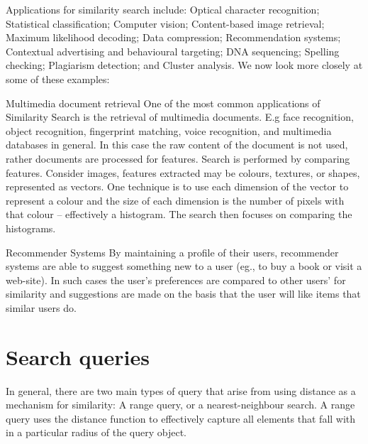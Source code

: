 Applications for similarity search include: Optical character recognition;
 Statistical classification;
 Computer vision;
 Content-based image retrieval;
 Maximum likelihood decoding; 
 Data compression;
 Recommendation systems;
 Contextual advertising and behavioural targeting;
 DNA sequencing;
 Spelling checking; 
 Plagiarism detection; and 
 Cluster analysis.     
We now look more closely at some of these examples:
%
\begin{myexample}{Multimedia document retrieval}
One of the most common applications of Similarity Search is the retrieval of multimedia documents. E.g face recognition, object recognition, fingerprint matching, voice recognition, and multimedia databases in general. In this case the raw content of the document is not used, rather documents are processed for features.  Search is performed by comparing features.  Consider images, features extracted may be colours, textures, or shapes, represented as vectors.  One technique is to use each dimension of the vector to represent a colour and the size of each dimension is the number of pixels with that colour -- effectively a histogram.  The search then focuses on comparing the histograms.
\end{myexample}
%
\noindent 
%
\begin{myexample}{Recommender Systems}
By maintaining a profile of their users, recommender systems are able to suggest something new to a user (eg., to buy a book or visit a web-site).  In such cases the user's preferences are compared to other users' for similarity and suggestions are made on the basis that the user will like items that similar users do.
\end{myexample}
% 
\section{Search queries}
In general, there are two main types of query that arise from using distance as a mechanism for similarity: A range query, or a nearest-neighbour search.  A range query uses the distance function to effectively capture all elements that fall with in a particular radius of the query object.
  
